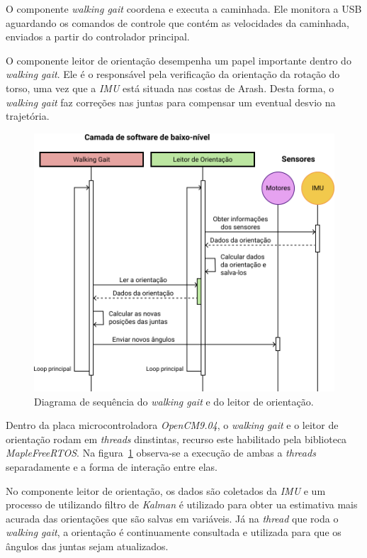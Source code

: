 O componente \textit{walking gait} coordena e executa a caminhada. Ele monitora a USB aguardando os comandos de controle que contém as velocidades da caminhada, enviados a partir do controlador principal.

O componente leitor de orientação desempenha um papel importante dentro do \textit{walking gait}. Ele é o responsável pela verificação da orientação da rotação do torso, uma vez que a \textit{IMU} está situada nas costas de Arash. Desta forma, o \textit{walking gait} faz correções nas juntas para compensar um eventual desvio na trajetória.

\begin{figure}[htb]
	\centering
	\includegraphics[scale=0.8]{imagens/svg/softwarearchitecture-lowlevel}
	\caption{Diagrama de sequência do \textit{walking gait} e do leitor de orientação.}
	\label{fig:softwarearchitecture:lowlevel}
\end{figure}

Dentro da placa microcontroladora \textit{OpenCM9.04}, o \textit{walking gait} e o leitor de orientação rodam em \textit{threads} dinstintas, recurso este habilitado pela biblioteca \textit{MapleFreeRTOS}. Na figura~\ref{fig:softwarearchitecture:lowlevel} observa-se a execução de ambas a \textit{threads} separadamente e a forma de interação entre elas.	

No componente leitor de orientação, os dados são coletados da \textit{IMU} e um processo de utilizando filtro de \textit{Kalman} é utilizado para obter ua estimativa mais acurada das orientações que são salvas em variáveis. Já na \textit{thread} que roda o \textit{walking gait}, a orientação é continuamente consultada e utilizada para que os ângulos das juntas sejam atualizados.

